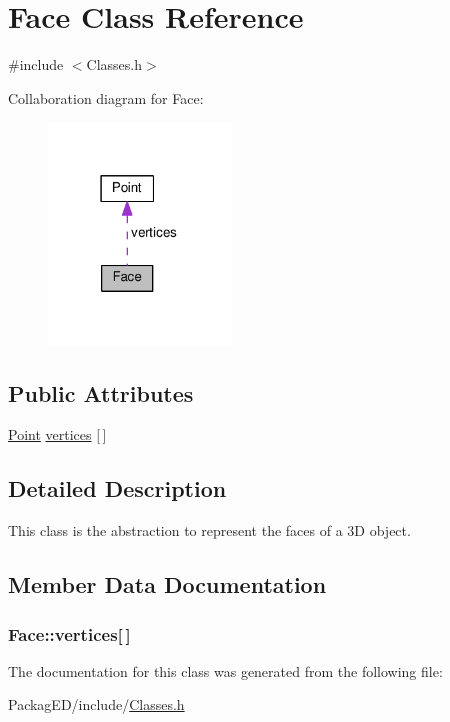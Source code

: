 \hypertarget{class_face}{}\section{Face Class Reference}
\label{class_face}


{\ttfamily \#include $<$Classes.\+h$>$}



Collaboration diagram for Face\+:
\nopagebreak
\begin{figure}[H]
\begin{center}
\leavevmode
\includegraphics[width=138pt]{class_face__coll__graph}
\end{center}
\end{figure}
\subsection*{Public Attributes}
\begin{DoxyCompactItemize}
\item 
\hyperlink{class_point}{Point} \hyperlink{class_face_acb5b50d81748e6dcbab0a533b336f534}{vertices} \mbox{[}$\,$\mbox{]}
\end{DoxyCompactItemize}


\subsection{Detailed Description}
This class is the abstraction to represent the faces of a 3D object. 

\subsection{Member Data Documentation}
\subsubsection[{\texorpdfstring{vertices}{vertices}}]{ Face\+::vertices\mbox{[}$\,$\mbox{]}}\hypertarget{class_face_acb5b50d81748e6dcbab0a533b336f534}{}\label{class_face_acb5b50d81748e6dcbab0a533b336f534}


The documentation for this class was generated from the following file\+:\begin{DoxyCompactItemize}
\item 
Packag\+E\+D/include/\hyperlink{_classes_8h}{Classes.\+h}\end{DoxyCompactItemize}
